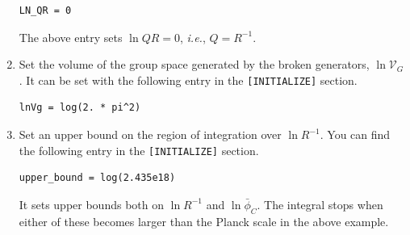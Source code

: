 \documentclass[12pt]{article}
\begin{document}
\begin{enumerate}
\begin{lstlisting}[basicstyle=\ttfamily\footnotesize, frame=single]
LN_QR = 0
\end{lstlisting}
       The above entry sets $\ln QR=0$, {\it i.e.}, $Q=R^{-1}$.
 \item Set the volume of the group space generated by the broken
       generators, $\ln \mathcal V_G$. It can be set with the following
       entry in the \verb|[INITIALIZE]| section.
\begin{lstlisting}[basicstyle=\ttfamily\footnotesize, frame=single]
lnVg = log(2. * pi^2)
\end{lstlisting}
 \item Set an upper bound on the region of integration over $\ln
       R^{-1}$. You can find the following entry in the
       \verb|[INITIALIZE]| section.
\begin{lstlisting}[basicstyle=\ttfamily\footnotesize, frame=single]
upper_bound = log(2.435e18)
\end{lstlisting}
      It sets upper bounds both on $\ln R^{-1}$ and $\ln\bar\phi_C$. The
       integral stops when either of these becomes larger than the
       Planck scale in the above example.


\end{enumerate}
\end{document}
